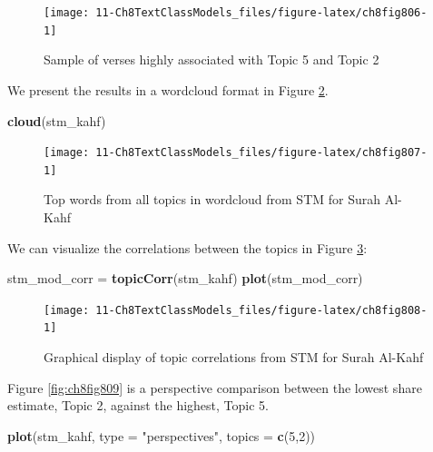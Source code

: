 \documentclass[
]{article}
\newenvironment{Shaded}{\begin{snugshade}}{\end{snugshade}}
\newcommand{\AttributeTok}[1]{\textcolor[rgb]{0.13,0.29,0.53}{#1}}
\newcommand{\DecValTok}[1]{\textcolor[rgb]{0.00,0.00,0.81}{#1}}
\newcommand{\FunctionTok}[1]{\textcolor[rgb]{0.13,0.29,0.53}{\textbf{#1}}}
\newcommand{\NormalTok}[1]{#1}
\newcommand{\OtherTok}[1]{\textcolor[rgb]{0.56,0.35,0.01}{#1}}
\newcommand{\StringTok}[1]{\textcolor[rgb]{0.31,0.60,0.02}{#1}}
\begin{document}
\begin{figure}

{\centering \texttt{[image: 11-Ch8TextClassModels\_files/figure-latex/ch8fig806-1]} 

}

\caption{Sample of verses highly associated with Topic 5 and Topic 2}\label{fig:ch8fig806}
\end{figure}

We present the results in a wordcloud format in Figure \ref{fig:ch8fig807}.

\begin{Shaded}
\begin{Highlighting}[]
\FunctionTok{cloud}\NormalTok{(stm\_kahf)}
\end{Highlighting}
\end{Shaded}

\begin{figure}

{\centering \texttt{[image: 11-Ch8TextClassModels\_files/figure-latex/ch8fig807-1]} 

}

\caption{Top words from all topics in wordcloud from STM for Surah Al-Kahf}\label{fig:ch8fig807}
\end{figure}

We can visualize the correlations between the topics in Figure \ref{fig:ch8fig808}:

\begin{Shaded}
\begin{Highlighting}[]
\NormalTok{stm\_mod\_corr }\OtherTok{=} \FunctionTok{topicCorr}\NormalTok{(stm\_kahf)}
\FunctionTok{plot}\NormalTok{(stm\_mod\_corr)}
\end{Highlighting}
\end{Shaded}

\begin{figure}

{\centering \texttt{[image: 11-Ch8TextClassModels\_files/figure-latex/ch8fig808-1]} 

}

\caption{Graphical display of topic correlations from STM for Surah Al-Kahf}\label{fig:ch8fig808}
\end{figure}

Figure \ref{fig:ch8fig809} is a perspective comparison between the lowest share estimate, Topic 2, against the highest, Topic 5.

\begin{Shaded}
\begin{Highlighting}[]
\FunctionTok{plot}\NormalTok{(stm\_kahf, }\AttributeTok{type =} \StringTok{"perspectives"}\NormalTok{, }\AttributeTok{topics =} \FunctionTok{c}\NormalTok{(}\DecValTok{5}\NormalTok{,}\DecValTok{2}\NormalTok{))}
\end{Highlighting}
\end{Shaded}
\end{document}
